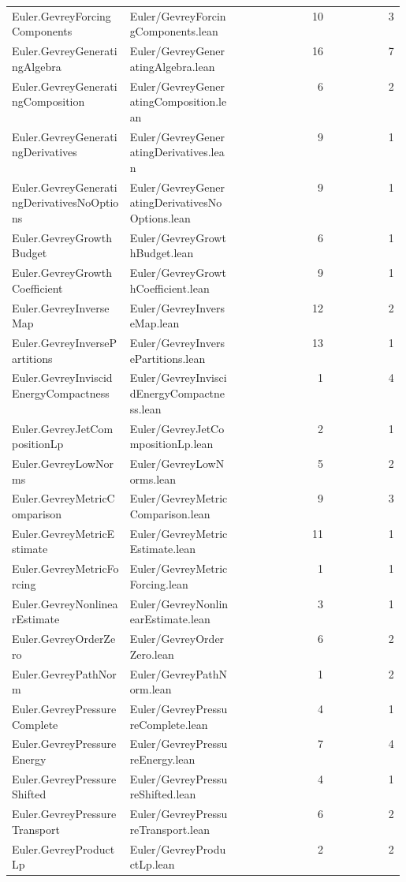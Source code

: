 \begin{longtable}{p{0.30\linewidth}p{0.28\linewidth}rr}
Euler.GevreyForcingComponents & Euler/GevreyForcingComponents.lean & 10 & 3\\
Euler.GevreyGeneratingAlgebra & Euler/GevreyGeneratingAlgebra.lean & 16 & 7\\
Euler.GevreyGeneratingComposition & Euler/GevreyGeneratingComposition.lean & 6 & 2\\
Euler.GevreyGeneratingDerivatives & Euler/GevreyGeneratingDerivatives.lean & 9 & 1\\
Euler.GevreyGeneratingDerivativesNoOptions & Euler/GevreyGeneratingDerivativesNoOptions.lean & 9 & 1\\
Euler.GevreyGrowthBudget & Euler/GevreyGrowthBudget.lean & 6 & 1\\
Euler.GevreyGrowthCoefficient & Euler/GevreyGrowthCoefficient.lean & 9 & 1\\
Euler.GevreyInverseMap & Euler/GevreyInverseMap.lean & 12 & 2\\
Euler.GevreyInversePartitions & Euler/GevreyInversePartitions.lean & 13 & 1\\
Euler.GevreyInviscidEnergyCompactness & Euler/GevreyInviscidEnergyCompactness.lean & 1 & 4\\
Euler.GevreyJetCompositionLp & Euler/GevreyJetCompositionLp.lean & 2 & 1\\
Euler.GevreyLowNorms & Euler/GevreyLowNorms.lean & 5 & 2\\
Euler.GevreyMetricComparison & Euler/GevreyMetricComparison.lean & 9 & 3\\
Euler.GevreyMetricEstimate & Euler/GevreyMetricEstimate.lean & 11 & 1\\
Euler.GevreyMetricForcing & Euler/GevreyMetricForcing.lean & 1 & 1\\
Euler.GevreyNonlinearEstimate & Euler/GevreyNonlinearEstimate.lean & 3 & 1\\
Euler.GevreyOrderZero & Euler/GevreyOrderZero.lean & 6 & 2\\
Euler.GevreyPathNorm & Euler/GevreyPathNorm.lean & 1 & 2\\
Euler.GevreyPressureComplete & Euler/GevreyPressureComplete.lean & 4 & 1\\
Euler.GevreyPressureEnergy & Euler/GevreyPressureEnergy.lean & 7 & 4\\
Euler.GevreyPressureShifted & Euler/GevreyPressureShifted.lean & 4 & 1\\
Euler.GevreyPressureTransport & Euler/GevreyPressureTransport.lean & 6 & 2\\
Euler.GevreyProductLp & Euler/GevreyProductLp.lean & 2 & 2\\

\end{longtable}
